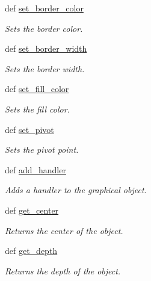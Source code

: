 \begin{DoxyCompactItemize}
def \hyperlink{classcs110graphics_1_1Fillable_a2f830be5d970faac97759910d20d68a4}{set\_\-border\_\-color}
\begin{DoxyCompactList}\small\item\em Sets the border color. \item\end{DoxyCompactList}\item 
def \hyperlink{classcs110graphics_1_1Fillable_a09f05462cb2ed38fdccb244340f05b2b}{set\_\-border\_\-width}
\begin{DoxyCompactList}\small\item\em Sets the border width. \item\end{DoxyCompactList}\item 
def \hyperlink{classcs110graphics_1_1Fillable_a4f24c7186c8d057e42a0209eb1d56be7}{set\_\-fill\_\-color}
\begin{DoxyCompactList}\small\item\em Sets the fill color. \item\end{DoxyCompactList}\item 
def \hyperlink{classcs110graphics_1_1Fillable_a2a6066d1a11c0854ff5ee85e7d9ceb54}{set\_\-pivot}
\begin{DoxyCompactList}\small\item\em Sets the pivot point. \item\end{DoxyCompactList}\item 
def \hyperlink{classcs110graphics_1_1GraphicalObject_adb1af0d5a6baae3f9a08d21a3227c49f}{add\_\-handler}
\begin{DoxyCompactList}\small\item\em Adds a handler to the graphical object. \item\end{DoxyCompactList}\item 
def \hyperlink{classcs110graphics_1_1GraphicalObject_a062789c4cc9de38af32dcc4ff2058607}{get\_\-center}
\begin{DoxyCompactList}\small\item\em Returns the center of the object. \item\end{DoxyCompactList}\item 
def \hyperlink{classcs110graphics_1_1GraphicalObject_a6d9f5718cd0cf249e0d2842971bae17f}{get\_\-depth}
\begin{DoxyCompactList}\small\item\em Returns the depth of the object. \item\end{DoxyCompactList}\item 

\end{DoxyCompactItemize}

